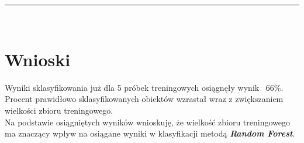 \documentclass[a4paper,12pt]{article}
\newcommand{\linia}{\rule{\linewidth}{0.5pt}}
\theoremstyle{mytheor}
\begin{document}
\linia\\

\section*{Wnioski}

Wyniki sklasyfikowania już dla 5 próbek treningowych osiągnęły wynik ~66\%.\\

Procent prawidłowo sklasyfikowanych obiektów wzrastał wraz z zwiększaniem wielkości zbioru treningowego.\\

Na podstawie osiągniętych wyników wnioskuję, że wielkość zbioru treningowego ma znaczący wpływ na osiągane wyniki w klasyfikacji metodą \textbf{\emph{Random Forest}}.
\end{document}
